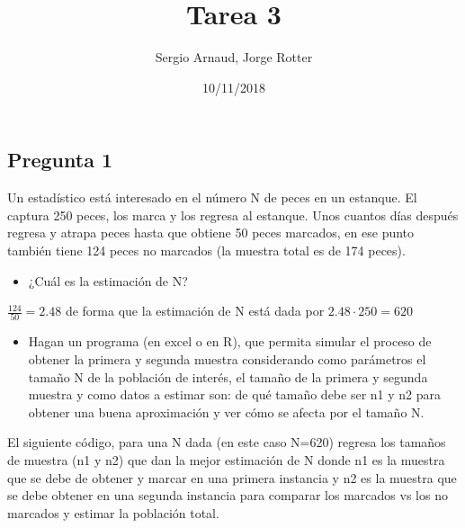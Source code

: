 \documentclass[]{article}
\title{Tarea 3}
\author{Sergio Arnaud, Jorge Rotter}
\date{10/11/2018}
\providecommand{\tightlist}{%
  \setlength{\itemsep}{0pt}\setlength{\parskip}{0pt}}
\begin{document}
\maketitle

\hypertarget{pregunta-1}{%
\subsection{Pregunta 1}\label{pregunta-1}}

Un estadístico está interesado en el número N de peces en un estanque.
El captura 250 peces, los marca y los regresa al estanque. Unos cuantos
días después regresa y atrapa peces hasta que obtiene 50 peces marcados,
en ese punto también tiene 124 peces no marcados (la muestra total es de
174 peces).

\begin{itemize}
\tightlist
\item
  ¿Cuál es la estimación de N?
\end{itemize}

\(\frac{124}{50} = 2.48\) de forma que la estimación de N está dada por
\(2.48\cdot250=620\)

\begin{itemize}
\tightlist
\item
  Hagan un programa (en excel o en R), que permita simular el proceso de
  obtener la primera y segunda muestra considerando como parámetros el
  tamaño N de la población de interés, el tamaño de la primera y segunda
  muestra y como datos a estimar son: de qué tamaño debe ser n1 y n2
  para obtener una buena aproximación y ver cómo se afecta por el tamaño
  N.
\end{itemize}

El siguiente código, para una N dada (en este caso N=620) regresa los
tamaños de muestra (n1 y n2) que dan la mejor estimación de N donde n1
es la muestra que se debe de obtener y marcar en una primera instancia y
n2 es la muestra que se debe obtener en una segunda instancia para
comparar los marcados vs los no marcados y estimar la población total.
\end{document}
